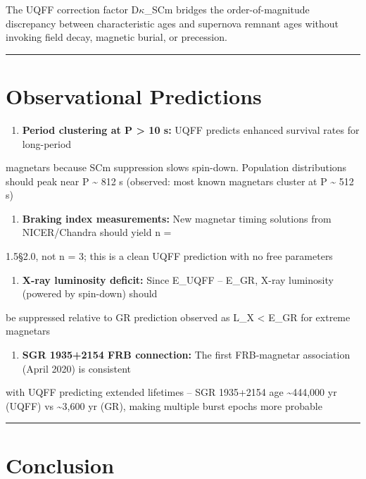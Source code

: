 \documentclass[12pt,a4paper]{article}
\begin{document}
The UQFF correction factor D$\kappa$\_SCm bridges the order-of-magnitude discrepancy between characteristic ages and supernova remnant ages without invoking field decay, magnetic burial, or precession.

\medskip\hrule\medskip

\section{Observational Predictions}

\begin{enumerate}
  \item \textbf{Period clustering at P > 10 s:} UQFF predicts enhanced survival rates for long-period
\end{enumerate}

magnetars because SCm suppression slows spin-down. Population distributions should peak near P \textasciitilde{} 812 s (observed: most known magnetars cluster at P \textasciitilde{} 512 s)

\begin{enumerate}
  \item \textbf{Braking index measurements:} New magnetar timing solutions from NICER/Chandra should yield n =
\end{enumerate}

1.5\S{}2.0, not n = 3; this is a clean UQFF prediction with no free parameters

\begin{enumerate}
  \item \textbf{X-ray luminosity deficit:} Since E\_UQFF -- E\_GR, X-ray luminosity (powered by spin-down) should
\end{enumerate}

be suppressed relative to GR prediction  observed as L\_X < E\_GR for extreme magnetars

\begin{enumerate}
  \item \textbf{SGR 1935+2154 FRB connection:} The first FRB-magnetar association (April 2020) is consistent
\end{enumerate}

with UQFF predicting extended lifetimes -- SGR 1935+2154 age \textasciitilde{}444,000 yr (UQFF) vs \textasciitilde{}3,600 yr (GR), making multiple burst epochs more probable

\medskip\hrule\medskip

\section{Conclusion}
\end{document}
